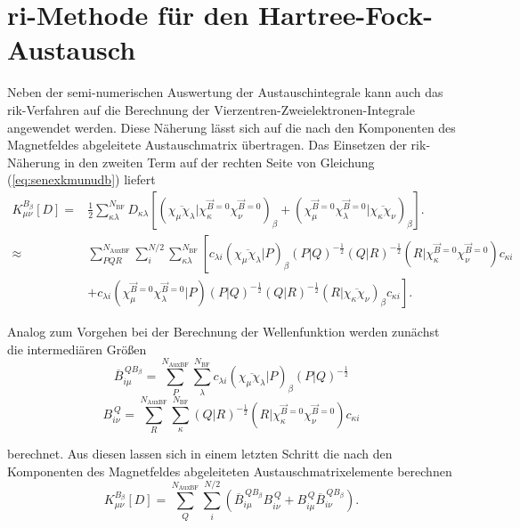 \section{\acs{ri}-Methode für den Hartree-Fock-Austausch}
Neben der semi-numerischen Auswertung der Austauschintegrale kann auch das \ac{rik}-Verfahren auf die Berechnung der Vierzentren-Zweielektronen-Integrale angewendet werden.\supercite{weigend2002fully} Diese Näherung lässt sich auf die nach den Komponenten des Magnetfeldes abgeleitete Austauschmatrix übertragen. Das Einsetzen der \ac{rik}-Näherung in den zweiten Term auf der rechten Seite von Gleichung (\ref{eq:senexkmunudb}) liefert
\begin{equation}
\begin{aligned}
K_{\mu\nu}^{B_\beta}[D]=&\frac{1}{2}\sum_{\kappa\lambda}^{N_{\textrm{BF}}}D_{\kappa\lambda} \left[\left(\overline{\chi_\mu\chi_\lambda}\vert\chi_\kappa^{\vec{B}=0}\chi_\nu^{\vec{B}=0}\right)_\beta+\left(\chi_\mu^{\vec{B}=0}\chi_\lambda^{\vec{B}=0}\vert\overline{\chi_\kappa\chi_\nu}\right)_\beta\right].\\
\approx& \sum_{PQR}^{N_{\text{AuxBF}}}\sum_i^{N/2}\sum_{\kappa\lambda}^{N_{\textrm{BF}}}\left[ c_{\lambda i} \left(\overline{\chi_\mu\chi_\lambda}\vert P\right)_\beta\left(P\vert Q\right)^{-\frac{1}{2}} \left(Q\vert R\right)^{-\frac{1}{2}} \left(R \vert\chi_\kappa^{\vec{B}=0}\chi_\nu^{\vec{B}=0}\right)c_{\kappa i} \right.\\
&\left.+c_{\lambda i}\left(\chi_\mu^{\vec{B}=0}\chi_\lambda^{\vec{B}=0}\vert P\right)\left(P\vert Q\right)^{-\frac{1}{2}} \left(Q\vert R\right)^{-\frac{1}{2}} \left(R\vert\overline{\chi_\kappa\chi_\nu}\right)_\beta c_{\kappa i}\right].
\end{aligned}
\end{equation}

Analog zum Vorgehen bei der Berechnung der Wellenfunktion werden zunächst die intermediären Größen 
\begin{equation}
\overline{B}_{i\mu}^{\,QB_\beta}=\sum_P^{N_{\text{AuxBF}}}\sum_{\lambda}^{N_{\textrm{BF}}}c_{\lambda i} \left(\overline{\chi_\mu\chi_\lambda}\vert P\right)_\beta\left(P\vert Q\right)^{-\frac{1}{2}}
\end{equation}
\begin{equation}
B_{i\nu}^{\,Q}=\sum_R^{N_{\text{AuxBF}}}\sum_{\kappa}^{N_{\textrm{BF}}}\left(Q\vert R\right)^{-\frac{1}{2}} \left(R \vert\chi_\kappa^{\vec{B}=0}\chi_\nu^{\vec{B}=0}\right)c_{\kappa i}
\end{equation}

berechnet. Aus diesen lassen sich in einem letzten Schritt die nach den Komponenten des Magnetfeldes abgeleiteten Austauschmatrixelemente berechnen
\begin{equation}
K_{\mu\nu}^{B_\beta}[D]=\sum_Q^{N_{\text{AuxBF}}}\sum_i^{N/2}\left(\overline{B}_{i\mu}^{\,QB_\beta} B_{i\nu}^{\,Q}+B_{i\mu}^{\,Q}\overline{B}_{i\nu}^{\,QB_\beta}\right).
\end{equation}